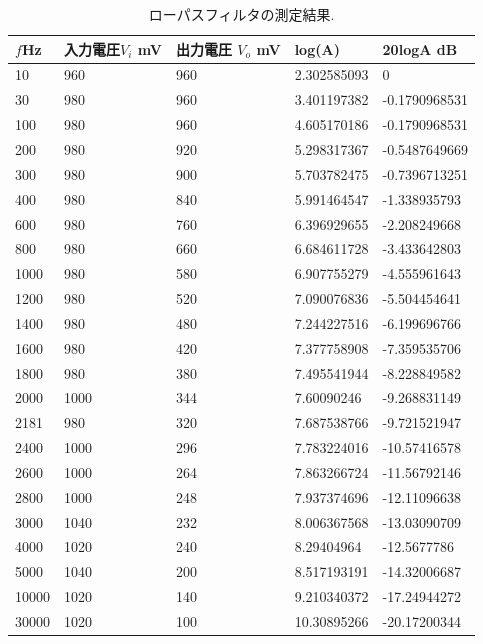 \documentclass[twocolumn, 10pt,a4j]{jsarticle}
\begin{document}
          \begin{table}[t]
            \centering
            \footnotesize
            \caption{ローパスフィルタの測定結果.}
            \label{opeanpu_risouteki_tokusei}
          \begin{tabular}{lllll} \hline

              $f$Hz& 入力電圧$V_{i}$ mV& 出力電圧 $V_{o}$ mV& log(A)& 20logA dB \\ \hline
              10& 960& 960& 2.302585093& 0 \\
              30& 980& 960& 3.401197382& -0.1790968531 \\
              100& 980& 960& 4.605170186& -0.1790968531 \\
              200& 980& 920& 5.298317367& -0.5487649669 \\
              300& 980& 900& 5.703782475& -0.7396713251 \\
              400& 980& 840& 5.991464547& -1.338935793 \\
              600& 980& 760& 6.396929655& -2.208249668 \\
              800& 980& 660& 6.684611728& -3.433642803 \\
              1000& 980& 580& 6.907755279& -4.555961643 \\
              1200& 980& 520& 7.090076836& -5.504454641 \\
              1400& 980& 480& 7.244227516& -6.199696766 \\
              1600& 980& 420& 7.377758908& -7.359535706 \\
              1800& 980& 380& 7.495541944& -8.228849582 \\
              2000& 1000& 344& 7.60090246& -9.268831149 \\
              2181& 980& 320& 7.687538766& -9.721521947 \\
              2400& 1000& 296& 7.783224016& -10.57416578 \\
              2600& 1000& 264& 7.863266724& -11.56792146 \\
              2800& 1000& 248& 7.937374696& -12.11096638 \\
              3000& 1040& 232& 8.006367568& -13.03090709 \\
              4000& 1020& 240& 8.29404964& -12.5677786 \\
              5000& 1040& 200& 8.517193191& -14.32006687 \\
              10000& 1020& 140& 9.210340372& -17.24944272 \\
              30000& 1020& 100& 10.30895266& -20.17200344 \\ \hline

            \end{tabular}
          \end{table}
\end{document}
